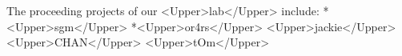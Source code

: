 The proceeding projects of our <Upper>lab</Upper> include:
   *<Upper>sgm</Upper>
   *<Upper>or4rs</Upper>
<Upper>jackie</Upper><Upper>CHAN</Upper>
<Upper>tOm</Upper>
